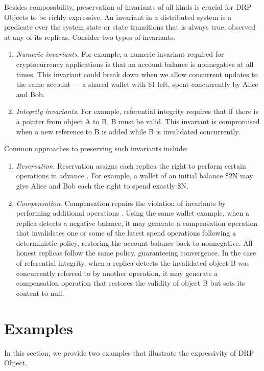 \documentclass{article}
\begin{document}
Besides composability, preservation of invariants of all kinds is crucial for DRP Objects to be richly expressive. An invariant in a distributed system is a predicate over the system state or state transitions that is always true, observed at any of its replicas. Consider two types of invariants:
\begin{enumerate}
    \item \textit{Numeric invariants}. For example, a numeric invariant required for cryptocurrency applications is that an account balance is nonnegative at all times. This invariant could break down when we allow concurrent updates to the same account — a shared wallet with \$1 left, spent concurrently by Alice and Bob.
    \item \textit{Integrity invariants}. For example, referential integrity requires that if there is a pointer from object A to B, B must be valid. This invariant is compromised when a new reference to B is added while B is invalidated concurrently.
\end{enumerate}

Common approaches to preserving such invariants include:
\begin{enumerate}
    \item \textit{Reservation}. Reservation assigns each replica the right to perform certain operations in advance \cite{Bounded-CRDT}. For example, a wallet of an initial balance \$2N may give Alice and Bob each the right to spend exactly \$N.
    \item \textit{Compensation}. Compensation repairs the violation of invariants by performing additional operations \cite{IPA}. Using the same wallet example, when a replica detects a negative balance, it may generate a compensation operation that invalidates one or some of the latest spend operations following a deterministic policy, restoring the account balance back to nonnegative. All honest replicas follow the same policy, guaranteeing convergence. In the case of referential integrity, when a replica detects the invalidated object B was concurrently referred to by another operation, it may generate a compensation operation that restores the validity of object B but sets its content to null.
\end{enumerate}

\section{Examples}
\label{sec:headings}

In this section, we provide two examples that illustrate the expressivity of DRP Object.
\end{document}
